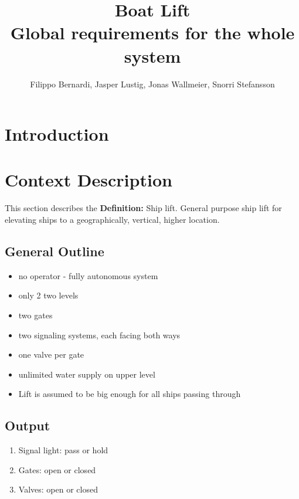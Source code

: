 \documentclass{article}
\begin{document}
\title{\huge{Boat Lift} \\ {\fontsize{13}{1} \selectfont Global requirements for the whole system} }
\author{Filippo Bernardi, Jasper Lustig, Jonas Wallmeier, Snorri Stefansson}

\maketitle



\vspace{3cm}


\pagebreak

\section{Introduction}

\section{Context Description}
This section describes the 
\textbf{Definition:}
Ship lift. General purpose ship lift for elevating ships to a geographically, vertical, higher location. \\
\subsection{General Outline}
\begin{itemize}
	\item no operator - fully autonomous system
	\item only 2 two levels
	\item two gates
	\item two signaling systems, each facing both ways
	\item one valve per gate
	\item unlimited water supply on upper level
	\item Lift is assumed to be big enough for all ships passing through
\end{itemize}
\pagebreak

\subsection{Output}
\begin{enumerate}
	\item Signal light: pass or hold
	\item Gates: open or closed
	\item Valves: open or closed
\end{enumerate}
\end{document}
